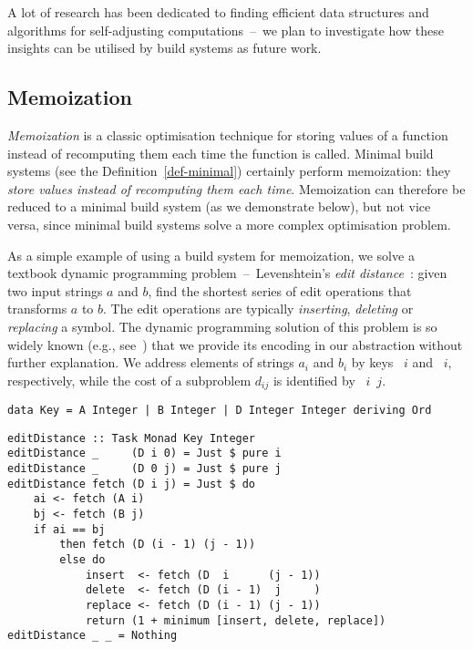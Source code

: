 A lot of research has been dedicated to finding efficient data structures and
algorithms for self-adjusting computations~--~we plan to investigate how these
insights can be utilised by build systems as future work.

\subsection{Memoization}\label{sec-related-memo}

\emph{Memoization} is a classic optimisation technique for storing values of a
function instead of recomputing them each time the function is called. Minimal
build systems (see the Definition~\ref{def-minimal}) certainly perform
memoization: they \emph{store values instead of recomputing them each time}.
Memoization can therefore be reduced to a minimal build system (as we
demonstrate below), but not vice versa, since minimal build systems solve a more
complex optimisation problem.

As a simple example of using a build system for memoization, we solve a textbook
dynamic programming problem~--~Levenshtein's \emph{edit
distance}~\cite{levenshtein1966binary}: given two input strings $a$ and
$b$, find the shortest series of edit operations that transforms $a$
to $b$. The edit operations are typically \emph{inserting}, \emph{deleting} or
\emph{replacing} a symbol. The dynamic programming solution of this problem is
so widely known (e.g., see~\cite{cormen2001introduction}) that we provide its
encoding in our  abstraction without further explanation.
We address elements of strings $a_i$ and $b_i$ by keys ~$i$ and ~$i$,
respectively, while the cost of a subproblem $d_{ij}$ is identified by
~$i$~$j$.

\begin{verbatim}
data Key = A Integer | B Integer | D Integer Integer deriving Ord
\end{verbatim}
\vspace{1mm}
\begin{verbatim}
editDistance :: Task Monad Key Integer
editDistance _     (D i 0) = Just $ pure i
editDistance _     (D 0 j) = Just $ pure j
editDistance fetch (D i j) = Just $ do
    ai <- fetch (A i)
    bj <- fetch (B j)
    if ai == bj
        then fetch (D (i - 1) (j - 1))
        else do
            insert  <- fetch (D  i      (j - 1))
            delete  <- fetch (D (i - 1)  j     )
            replace <- fetch (D (i - 1) (j - 1))
            return (1 + minimum [insert, delete, replace])
editDistance _ _ = Nothing
\end{verbatim}

